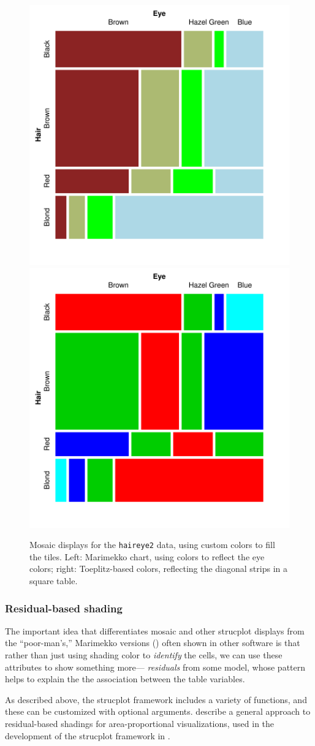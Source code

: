 \documentclass[11pt]{book}\usepackage[]{graphicx}\usepackage[]{color}
\begin{document}
\begin{figure}
\centering 
\includegraphics[width=.49\textwidth]{ch05/fig/HE-fill1}
\includegraphics[width=.49\textwidth]{ch05/fig/HE-fill2}
\caption{Mosaic displays for the \texttt{haireye2} data, using custom colors to fill the tiles. Left: Marimekko chart, using colors to reflect the eye colors; right: Toeplitz-based colors, reflecting the diagonal strips in a square table.}\label{fig:HE-fill}
\end{figure}

\subsubsection{Residual-based shading}
The important idea that differentiates mosaic and other strucplot displays from the 
``poor-man's,'' Marimekko versions ()
often shown in other software is that rather than
just using shading color to \emph{identify} the cells, we can use these attributes to
show something more--- \emph{residuals} from some model, whose pattern helps to explain
the the association between the table variables.

As described above, the strucplot framework includes a variety of  functions,
and these can be customized with optional arguments. 
\citet{Zeileis-etal:2007} describe a general approach to residual-based shadings for area-proportional
visualizations, used in the development of the strucplot framework in .
\end{document}
